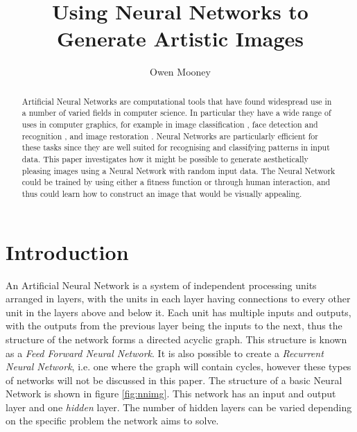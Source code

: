 \documentclass{acm_proc_article-sp}
\begin{document}

\title{Using Neural Networks to Generate Artistic Images}
\author{Owen Mooney}

\maketitle

\begin{abstract}
Artificial Neural Networks are computational tools that have found widespread use in a number of varied fields in computer science. In particular they have a wide range of uses in computer graphics, for example in image classification \cite{Zhang:1992:ANN:503720.503776}, face detection \cite{Lee:2002:EAF:646864.708276} and recognition \cite{Zhao:2003:FRL:954339.954342}, and image restoration \cite{deCastro:2008:RIM:1363686.1364088}. Neural Networks are particularly efficient for these tasks since they are well suited for recognising and classifying patterns in input data. This paper investigates how it might be possible to generate aesthetically pleasing images using a Neural Network with random input data. The Neural Network could be trained by using either a fitness function or through human interaction, and thus could learn how to construct an image that would be visually appealing.
\end{abstract}

\section{Introduction}
\label{sec:intro}
An Artificial Neural Network is a system of independent processing units arranged in layers, with the units in each layer having connections to every other unit in the layers above and below it. Each unit has multiple inputs and outputs, with the outputs from the previous layer being the inputs to the next, thus the structure of the network forms a directed acyclic graph. This structure is known as a \textit{Feed Forward Neural Network}. It is also possible to create a \textit{Recurrent Neural Network}, i.e. one where the graph will contain cycles,  however these types of networks will not be discussed in this paper. The structure of a basic Neural Network is shown in figure \ref{fig:nnimg}. This network has an input and output layer and one \textit{hidden} layer. The number of hidden layers can be varied depending on the specific problem the network aims to solve.
\end{document}
